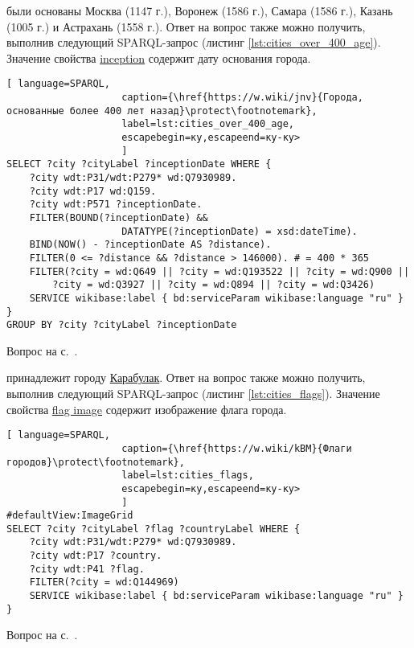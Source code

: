 \begin{task}
    \label{answer:cities_over_400_age}
     были основаны Москва (1147 г.), Воронеж (1586 г.), Самара (1586 г.), Казань (1005 г.) и Астрахань (1558 г.). Ответ на вопрос также можно получить, выполнив следующий SPARQL-запрос (листинг \ref{lst:cities_over_400_age}). Значение свойства \href{https://www.wikidata.org/wiki/Property:P571}{inception} содержит дату основания города.
    \begin{lstlisting}[ language=SPARQL, 
                    caption={\href{https://w.wiki/jnv}{Города, основанные более 400 лет назад}\protect\footnotemark},
                    label=lst:cities_over_400_age, 
                    escapebegin=ку,escapeend=ку-ку>
                    ]
SELECT ?city ?cityLabel ?inceptionDate WHERE {
	?city wdt:P31/wdt:P279* wd:Q7930989.
	?city wdt:P17 wd:Q159.
	?city wdt:P571 ?inceptionDate.
	FILTER(BOUND(?inceptionDate) && 
					DATATYPE(?inceptionDate) = xsd:dateTime).
	BIND(NOW() - ?inceptionDate AS ?distance).
	FILTER(0 <= ?distance && ?distance > 146000). # = 400 * 365
	FILTER(?city = wd:Q649 || ?city = wd:Q193522 || ?city = wd:Q900 ||
		?city = wd:Q3927 || ?city = wd:Q894 || ?city = wd:Q3426)
	SERVICE wikibase:label { bd:serviceParam wikibase:language "ru" }
}
GROUP BY ?city ?cityLabel ?inceptionDate    
\end{lstlisting}

    \small{Вопрос на с.~\pageref{fig:city_relation_Russia_S_N}.}
\end{task}

\begin{task}
    \label{answer:cities_flags}
     принадлежит городу \href{https://bit.ly/2IqZivr}{Карабулак}. Ответ на вопрос также можно получить, выполнив следующий SPARQL-запрос (листинг \ref{lst:cities_flags}). Значение свойства \href{https://www.wikidata.org/wiki/Property:P41}{flag image} содержит изображение флага города.
    
    \begin{lstlisting}[ language=SPARQL, 
                    caption={\href{https://w.wiki/kBM}{Флаги городов}\protect\footnotemark},
                    label=lst:cities_flags, 
                    escapebegin=ку,escapeend=ку-ку>
                    ]
#defaultView:ImageGrid
SELECT ?city ?cityLabel ?flag ?countryLabel WHERE {
	?city wdt:P31/wdt:P279* wd:Q7930989.
	?city wdt:P17 ?country.
	?city wdt:P41 ?flag.
	FILTER(?city = wd:Q144969)
	SERVICE wikibase:label { bd:serviceParam wikibase:language "ru" }
}
\end{lstlisting}
    
    \small{Вопрос на с.~\pageref{lst:countries_sister_cities_with_Russia}.}
\end{task}

